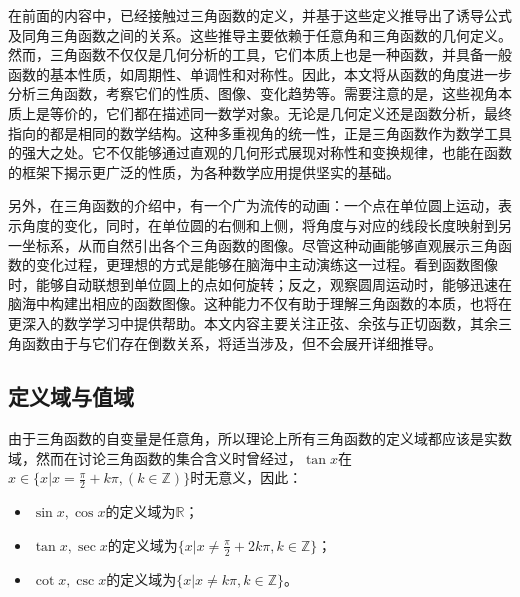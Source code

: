 
\begin{issues}
\issueDraft
\end{issues}


在前面的内容中，已经接触过三角函数的定义，并基于这些定义推导出了诱导公式及同角三角函数之间的关系。这些推导主要依赖于任意角和三角函数的几何定义。然而，三角函数不仅仅是几何分析的工具，它们本质上也是一种函数，并具备一般函数的基本性质，如周期性、单调性和对称性。因此，本文将从函数的角度进一步分析三角函数，考察它们的性质、图像、变化趋势等。需要注意的是，这些视角本质上是等价的，它们都在描述同一数学对象。无论是几何定义还是函数分析，最终指向的都是相同的数学结构。这种多重视角的统一性，正是三角函数作为数学工具的强大之处。它不仅能够通过直观的几何形式展现对称性和变换规律，也能在函数的框架下揭示更广泛的性质，为各种数学应用提供坚实的基础。

另外，在三角函数的介绍中，有一个广为流传的动画：一个点在单位圆上运动，表示角度的变化，同时，在单位圆的右侧和上侧，将角度与对应的线段长度映射到另一坐标系，从而自然引出各个三角函数的图像。尽管这种动画能够直观展示三角函数的变化过程，更理想的方式是能够在脑海中主动演练这一过程。看到函数图像时，能够自动联想到单位圆上的点如何旋转；反之，观察圆周运动时，能够迅速在脑海中构建出相应的函数图像。这种能力不仅有助于理解三角函数的本质，也将在更深入的数学学习中提供帮助。本文内容主要关注正弦、余弦与正切函数，其余三角函数由于与它们存在倒数关系，将适当涉及，但不会展开详细推导。

\subsection{定义域与值域}

由于三角函数的自变量是任意角，所以理论上所有三角函数的定义域都应该是实数域，然而在讨论三角函数的集合含义时曾经过，$\tan x$在$\displaystyle x\in\{x|x=\frac{\pi}{2}+k\pi,(k\in\mathbb{Z})\}$时无意义，因此：
\begin{itemize}
\item $\sin x,\cos x$的定义域为$\mathbb{R}$；
\item $\tan x,\sec x$的定义域为$\displaystyle\{x|x\neq\frac{\pi}{2}+2k\pi,k\in\mathbb{Z}\}$；
\item $\cot x,\csc x$的定义域为$\displaystyle\{x|x\neq k\pi,k\in\mathbb{Z}\}$。
\end{itemize}

